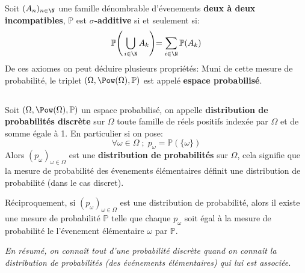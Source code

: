 Soit \((A_n)_{n \in \N}\) une famille dénombrable d'évenements \textbf{deux à deux incompatibles}, \(\mathbb{P}\) est \textbf{\(\sigma\)-additive} si et seulement si:
\[
   \mathbb{P}\Biggl(\,\bigcup_{i \in \N} A_k\Biggl) = \sum_{i \in \N}\mathbb{P}(A_k)
\]
De ces axiomes on peut déduire plusieurs propriétés:
Muni de cette mesure de probabilité, le triplet \((\Omega, \Pow(\Omega), \mathbb{P})\) est appelé \textbf{espace probabilisé}.

\subsection*{}
Soit \((\Omega, \Pow(\Omega), \mathbb{P})\) un espace probabilisé, on appelle \textbf{distribution de probabilités discrète} sur \(\Omega\) toute famille de réels positifs
indexée par \(\Omega\) et de somme égale à 1. En particulier si on pose:
\[
   \forall \omega \in \Omega \; ; \; p_\omega = \mathbb{P}(\{\omega\})   
\]
Alors \((p_\omega)_{\omega \in \Omega}\) est une \textbf{distribution de probabilités} sur \(\Omega\), cela signifie que la mesure de probabilité des évenements élémentaires définit une distribution de probabilité (dans le cas discret).\<

Réciproquement, si \((p_\omega)_{\omega \in \Omega}\) est une distribution de probabilité, alors il existe une mesure de probabilité \(\mathbb{P}\) telle que chaque \(p_{\omega}\) soit égal à la mesure de probabilité le l'évenement élémentaire \(\omega\) par \(\mathbb{P}\).

\begin{center}
   \textit{En résumé, on connaît tout d'une probabilité discrète quand on connaît\+ la distribution de probabilités 
   (des événements élémentaires) qui lui est associée. }
\end{center}

